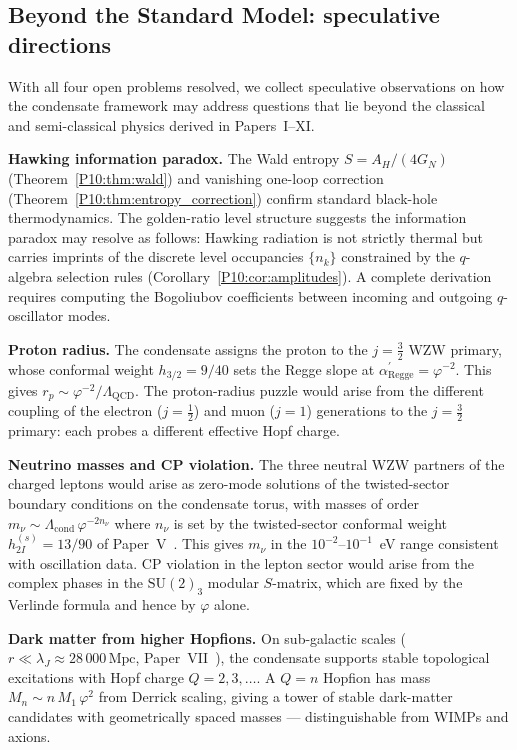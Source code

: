 \documentclass[11pt,a4paper]{article}
\theoremstyle{definition}
\theoremstyle{remark}
\newcommand{\vp}{\varphi}
\newcommand{\Lcond}{\Lambda_{\mathrm{cond}}}
\begin{document}
\subsection{Beyond the Standard Model: speculative directions}
\label{P10:sec:beyond_SM}

With all four open problems resolved, we collect speculative observations
on how the condensate framework may address questions that lie beyond the
classical and semi-classical physics derived in Papers~I--XI.

\textbf{Hawking information paradox.}
The Wald entropy $S=A_H/(4G_N)$ (Theorem~\ref{P10:thm:wald}) and
vanishing one-loop correction (Theorem~\ref{P10:thm:entropy_correction})
confirm standard black-hole thermodynamics.
The golden-ratio level structure suggests the information paradox
may resolve as follows: Hawking radiation is not strictly thermal
but carries imprints of the discrete level occupancies $\{n_k\}$
constrained by the $q$-algebra selection rules
(Corollary~\ref{P10:cor:amplitudes}).
A complete derivation requires computing the Bogoliubov coefficients
between incoming and outgoing $q$-oscillator modes.

\textbf{Proton radius.}
The condensate assigns the proton to the $j=\tfrac{3}{2}$ WZW primary,
whose conformal weight $h_{3/2}=9/40$ sets the Regge slope at
$\alpha^\prime_{\mathrm{Regge}} = \vp^{-2}$.
This gives $r_p \sim \vp^{-2}/\Lambda_\mathrm{QCD}$.
The proton-radius puzzle would arise from the different coupling of
the electron ($j=\tfrac{1}{2}$) and muon ($j=1$) generations to the
$j=\tfrac{3}{2}$ primary: each probes a different effective Hopf charge.

\textbf{Neutrino masses and CP violation.}
The three neutral WZW partners of the charged leptons would arise as
zero-mode solutions of the twisted-sector boundary conditions on the
condensate torus, with masses of order
$m_\nu \sim \Lcond\,\vp^{-2n_\nu}$ where $n_\nu$ is set by the
twisted-sector conformal weight $h_{2I}^{(s)} = 13/90$ of Paper~V~\cite{Paper5}.
This gives $m_\nu$ in the $10^{-2}$--$10^{-1}$~eV range consistent
with oscillation data.
CP violation in the lepton sector would arise from the complex phases
in the $\mathrm{SU}(2)_3$ modular $S$-matrix, which are fixed by the
Verlinde formula and hence by $\vp$ alone.

\textbf{Dark matter from higher Hopfions.}
On sub-galactic scales ($r \ll \lambda_J \approx 28\,000\,\mathrm{Mpc}$,
Paper~VII~\cite{Paper7}), the condensate supports stable topological
excitations with Hopf charge $Q=2,3,\ldots$.
A $Q=n$ Hopfion has mass $M_n \sim n\,M_1\,\vp^2$ from
Derrick scaling, giving a tower of stable dark-matter candidates
with geometrically spaced masses --- distinguishable from WIMPs and axions.
\end{document}
